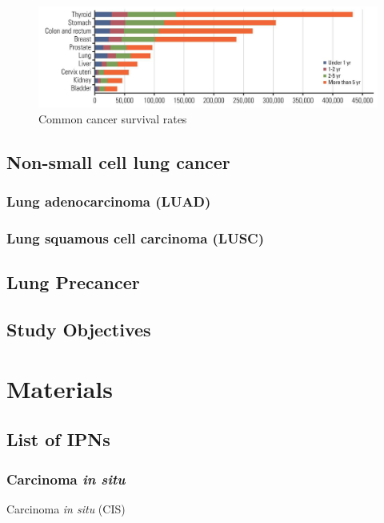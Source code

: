 \documentclass[11pt,a4paper,onecolumn,oneside]{report}
\begin{document}
            \begin{figure}[p]
                \centering
                \includegraphics[width=0.8 \linewidth]{figures/LungCancer/rate.png}
                \caption{Common cancer survival rates \protect\cite{lung6}}
                \label{fig:cancer-survival}
            \end{figure}

        \subsection{Non-small cell lung cancer}

            \subsubsection{Lung adenocarcinoma (LUAD)}

            \subsubsection{Lung squamous cell carcinoma (LUSC)}

        \subsection{Lung Precancer}

        \subsection{Study Objectives}
    \newpage

    \section{Materials}
        \subsection{List of IPNs}
            \subsubsection{Carcinoma \textit{in situ}}
                Carcinoma \textit{in situ} (CIS)
\end{document}
